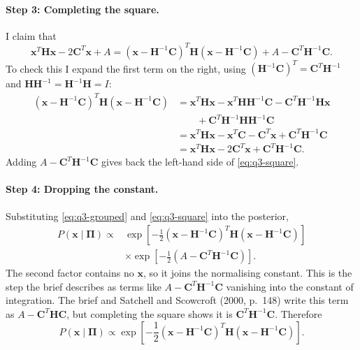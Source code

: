 \documentclass[11pt]{article}
\numberwithin{equation}{section}
\begin{document}
\paragraph{Step 3: Completing the square.}
I claim that
\begin{equation}
  \bm{x}^{T}\bm{H}\bm{x} - 2\bm{C}^{T}\bm{x} + A
  = \left(\bm{x} - \bm{H}^{-1}\bm{C}\right)^{T}\bm{H}\left(\bm{x} - \bm{H}^{-1}\bm{C}\right) + A - \bm{C}^{T}\bm{H}^{-1}\bm{C}.
  \label{eq:q3-square}
\end{equation}
To check this I expand the first term on the right, using $(\bm{H}^{-1}\bm{C})^{T} = \bm{C}^{T}\bm{H}^{-1}$ and $\bm{H}\bm{H}^{-1} = \bm{H}^{-1}\bm{H} = I$:
\begin{align*}
  \left(\bm{x} - \bm{H}^{-1}\bm{C}\right)^{T}\bm{H}\left(\bm{x} - \bm{H}^{-1}\bm{C}\right)
  &= \bm{x}^{T}\bm{H}\bm{x} - \bm{x}^{T}\bm{H}\bm{H}^{-1}\bm{C} - \bm{C}^{T}\bm{H}^{-1}\bm{H}\bm{x} \\
  &\qquad + \bm{C}^{T}\bm{H}^{-1}\bm{H}\bm{H}^{-1}\bm{C} \\
  &= \bm{x}^{T}\bm{H}\bm{x} - \bm{x}^{T}\bm{C} - \bm{C}^{T}\bm{x} + \bm{C}^{T}\bm{H}^{-1}\bm{C} \\
  &= \bm{x}^{T}\bm{H}\bm{x} - 2\bm{C}^{T}\bm{x} + \bm{C}^{T}\bm{H}^{-1}\bm{C}.
\end{align*}
Adding $A - \bm{C}^{T}\bm{H}^{-1}\bm{C}$ gives back the left-hand side of \eqref{eq:q3-square}.

\paragraph{Step 4: Dropping the constant.}
Substituting \eqref{eq:q3-grouped} and \eqref{eq:q3-square} into the posterior,
\begin{align*}
  P\left(\bm{x} \mid \bm{\Pi}\right) \propto {} &
  \exp\left[-\frac{1}{2}\left(\bm{x} - \bm{H}^{-1}\bm{C}\right)^{T}\bm{H}\left(\bm{x} - \bm{H}^{-1}\bm{C}\right)\right] \\
  & \times \exp\left[-\frac{1}{2}\left(A - \bm{C}^{T}\bm{H}^{-1}\bm{C}\right)\right].
\end{align*}
The second factor contains no $\bm{x}$, so it joins the normalising constant. This is the step the brief describes as terms like $A - \bm{C}^{T}\bm{H}^{-1}\bm{C}$ vanishing into the constant of integration. The brief and Satchell and Scowcroft (2000, p.~148) write this term as $A - \bm{C}^{T}\bm{H}\bm{C}$, but completing the square shows it is $\bm{C}^{T}\bm{H}^{-1}\bm{C}$. Therefore
\begin{equation}
  P\left(\bm{x} \mid \bm{\Pi}\right) \propto \exp\left[-\frac{1}{2}\left(\bm{x} - \bm{H}^{-1}\bm{C}\right)^{T}\bm{H}\left(\bm{x} - \bm{H}^{-1}\bm{C}\right)\right].
  \label{eq:q3-kernel}
\end{equation}
\end{document}
